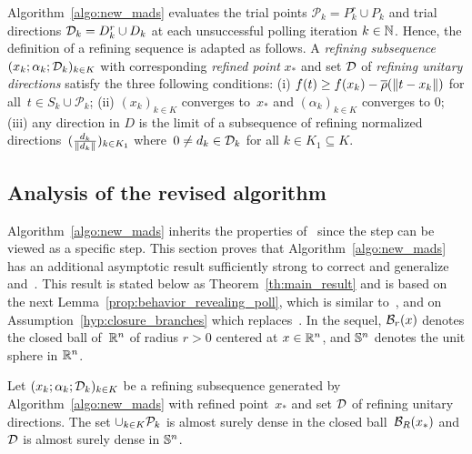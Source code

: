 Algorithm~\ref{algo:new_mads} evaluates the trial points $\mathcal{P}_k = P^r_k \cup P_k$ and trial directions $\D_k = D^r_k \cup D_k$ at each unsuccessful polling iteration $k \in \N$.
Hence, the definition of a refining sequence is adapted as follows.
A \textit{refining subsequence} $(x_k;\alpha_k;\D_k)_{k \in K}$ with corresponding \textit{refined point} $x_*$ and set $\D$ of \textit{refining unitary directions} satisfy the three following conditions: (i) $f(t) \geq f(x_k) - \overline{\rho}(\norm{t-x_k})$ for all~$t \in S_k \cup \mathcal{P}_k$; (ii) $(x_k)_{k \in K}$ converges to~$x_*$ and $(\alpha_k)_{k \in K}$ converges to $0$; (iii) any direction in $D$ is the limit of a subsequence of refining normalized directions~$(\frac{d_k}{\norm{d_k}})_{k \in K_1}$ where~$0 \neq d_k \in \D_k$ for all $k \in K_1 \subseteq K$.



\subsection{Analysis of the revised algorithm}
\label{sec:new_framework/analysis}

Algorithm~\ref{algo:new_mads} inherits the properties of~\cite[Algorithm~2.1]{ViCu2012} since the \revpoll step can be viewed as a specific \search step.
This section proves that Algorithm~\ref{algo:new_mads} has an additional asymptotic result sufficiently strong to correct and generalize~\cite[Theorem~4.1]{ViCu2012} and~\cite[Corollary~4.1]{ViCu2012}.
This result is stated below as Theorem~\ref{th:main_result} and is based on the next Lemma~\ref{prop:behavior_revealing_poll}, which is similar to~\cite[Lemma~4.12]{AuBaKo22}, and on Assumption~\ref{hyp:closure_branches} which replaces~\cite[Assumption~4.1]{ViCu2012}.
In the sequel, $\B_r(x)$ denotes the closed ball of~$\R^n$ of radius $r > 0$ centered at $x \in \R^n$, and $\S^n$ denotes the unit sphere in $\R^n$.

\vspace{0.1cm}

\begin{lemma}
	\label{prop:behavior_revealing_poll}
	Let $(x_k;\alpha_k;\D_k)_{k \in K}$ be a refining subsequence generated by Algorithm~\ref{algo:new_mads} with refined point~$x_*$ and set $\D$ of refining unitary directions.
	The set $\cup_{k \in K} \P_k$ is almost surely dense in the closed ball~$\B_R(x_*)$ and $\D$ is almost surely dense in $\S^n$.
\end{lemma}

